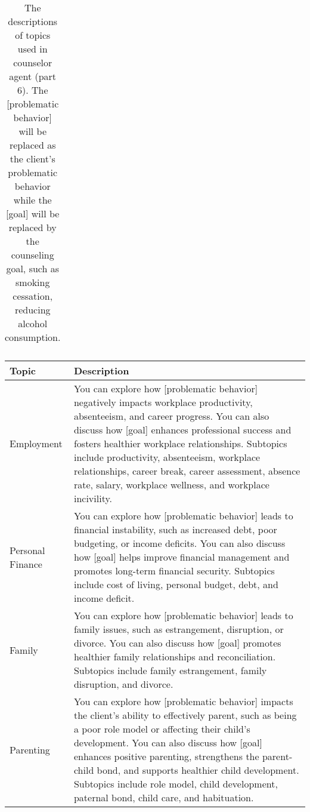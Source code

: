 \begin{table*}[tb]
\begin{tabularx}{\textwidth}{lX}
\\ \bottomrule
\end{tabularx}
\caption{The descriptions of topics used in counselor agent (part 6). The [problematic behavior] will be replaced as the client's problematic behavior while the [goal] will be replaced by the counseling goal, such as smoking cessation, reducing alcohol consumption.}
\label{tab:counselor topic description 6}
\end{table*}   

\begin{table*}[tb]
\centering
\begin{tabularx}{\textwidth}{lX}
\toprule
Topic            & Description                                            \\ \midrule
Employment                  & You can explore how [problematic behavior] negatively impacts workplace productivity, absenteeism, and career progress. You can also discuss how [goal] enhances professional success and fosters healthier workplace relationships. Subtopics include productivity, absenteeism, workplace relationships, career break, career assessment, absence rate, salary, workplace wellness, and workplace incivility.                    \\ \hline
Personal Finance            & You can explore how [problematic behavior] leads to financial instability, such as increased debt, poor budgeting, or income deficits. You can also discuss how [goal] helps improve financial management and promotes long-term financial security. Subtopics include cost of living, personal budget, debt, and income deficit.                                                                                                  \\ \hline
Family                      & You can explore how [problematic behavior] leads to family issues, such as estrangement, disruption, or divorce. You can also discuss how [goal] promotes healthier family relationships and reconciliation. Subtopics include family estrangement, family disruption, and divorce.                                                                                                                                                \\ \hline
Parenting                   & You can explore how [problematic behavior] impacts the client's ability to effectively parent, such as being a poor role model or affecting their child’s development. You can also discuss how [goal] enhances positive parenting, strengthens the parent-child bond, and supports healthier child development. Subtopics include role model, child development, paternal bond, child care, and habituation.                      \\ \hline

\end{tabularx}
\end{table*}
